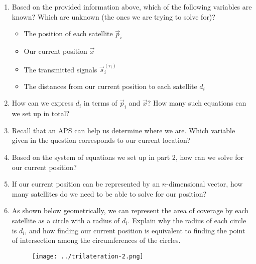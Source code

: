 \begin{enumerate}
    \item Based on the provided information above, which of the following variables are known? Which are unknown (the ones we are trying to solve for)?

        \begin{itemize}
            \item The position of each satellite $\vec{p}_i$
            \item Our current position $\vec{x}$
            \item The transmitted signals $\vec{s}_i^{(\tau_i)}$
            \item The distances from our current position to each satellite $d_i$
        \end{itemize}
    \answerbox{2cm}

    \item How can we express $d_i$ in terms of $\vec{p}_i$ and $\vec{x}$? How many such equations can we set up in total?

    \answerbox{5cm}


    \item Recall that an APS can help us determine where we are. Which variable given in the question corresponds to our current location?

    \answerbox{1cm}

    \item Based on the system of equations we set up in part 2, how can we solve for our current position?

    \answerbox{6cm}

    \item If our current position can be represented by an $n$-dimensional vector, how many satellites do we need to be able to solve for our position?

    \answerbox{1cm}

    \item As shown below geometrically, we can represent the area of coverage by each satellite as a circle with a radius of $d_i$. Explain why the radius of each circle is $d_i$, and how finding our current position is equivalent to finding the point of intersection among the circumferences of the circles.
    \begin{figure}[H]
        \centering
        \texttt{[image: ../trilateration-2.png]}
    \end{figure}

    \answerbox{4cm}


\end{enumerate}
